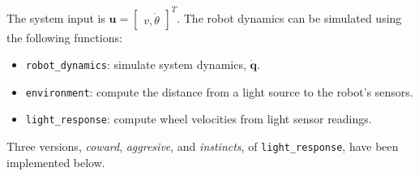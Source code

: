 \documentclass[12pt]{article}
\begin{document}
	The system input is $\pmb{u} = \begin{bmatrix} v, \dot \theta \end{bmatrix}^T$. The robot dynamics can be simulated using the following functions: 
	
	\begin{itemize}
		\item \texttt{robot\_dynamics}: simulate system dynamics, $\pmb{\dot q}$.
		\item \texttt{environment}: compute the distance from a light source to the robot's sensors.
		\item \texttt{light\_response}: compute wheel velocities from light sensor readings.
	\end{itemize}

	Three versions, \emph{coward}, \emph{aggresive}, and \emph{instincts}, of \texttt{light\_response}, have been implemented below.
\end{document}

